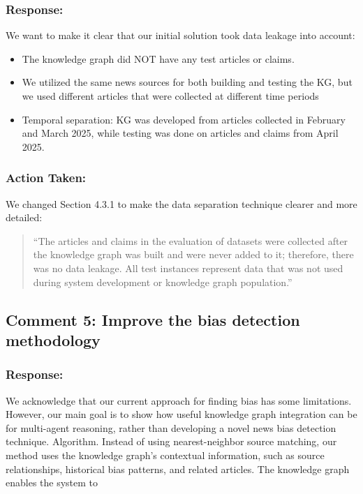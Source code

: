 \documentclass[11pt]{article}
\begin{document}
\subsubsection*{Response:}
We want to make it clear that our initial solution took data leakage into account:

\begin{itemize}
    \item The knowledge graph did NOT have any test articles or claims.
    \item We utilized the same news sources for both building and testing the KG, but we used different articles that were collected at different time periods

    \item Temporal separation: KG was developed from articles collected in February and March 2025, while testing was done on articles and claims from April 2025.
\end{itemize}

\subsubsection*{Action Taken:}
We changed Section 4.3.1 to make the data separation technique clearer and more detailed:


\begin{quote}
``The articles and claims in the evaluation of datasets were collected after the knowledge graph was built and were never added to it; therefore, there was no data leakage.
All test instances represent data that was not used during system development or knowledge graph population.''
\end{quote}

\subsection{Comment 5: Improve the bias detection methodology}

\subsubsection*{Response:}
We acknowledge that our current approach for finding bias has some limitations. However,  our main goal is to show how useful knowledge graph integration can be for multi-agent reasoning, rather than developing a novel news bias detection technique. Algorithm. 
Instead of using nearest-neighbor source matching, our method uses the knowledge graph's contextual information, such as source relationships, historical bias patterns, and related articles.
The knowledge graph enables the system to 
\end{document}
